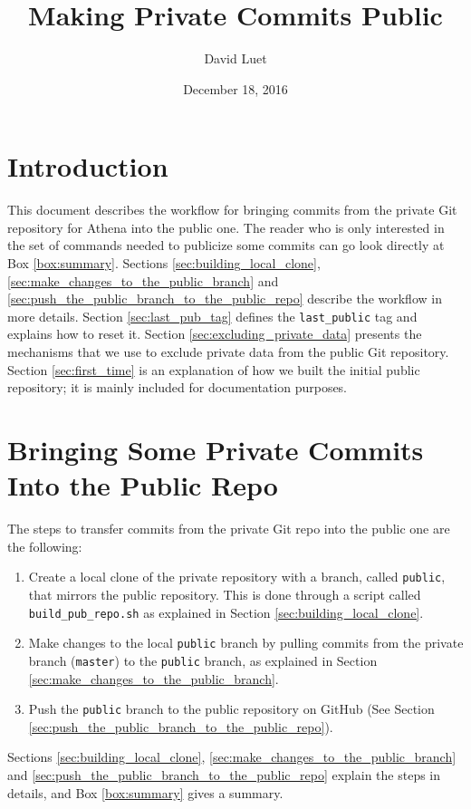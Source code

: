 \documentclass[11pt]{article}
\author{David Luet}
\date{December 18, 2016}
\title{Making Private Commits Public}
\begin{document}
\maketitle
\tableofcontents


\section{Introduction}
This document describes the workflow for bringing commits from the
private Git repository for Athena into the public one.  The reader who
is only interested in the set of commands needed to publicize some
commits can go look directly at Box \ref{box:summary}. Sections
\ref{sec:building_local_clone},
\ref{sec:make_changes_to_the_public_branch} and
\ref{sec:push_the_public_branch_to_the_public_repo} describe the
workflow in more details.  Section \ref{sec:last_pub_tag} defines the
\texttt{last\_public} tag and explains how to reset it.  Section
\ref{sec:excluding_private_data} presents the mechanisms that we use
to exclude private data from the public Git repository.  Section
\ref{sec:first_time} is an explanation of how we built the initial
public repository; it is mainly included for documentation purposes.

\section{Bringing Some Private Commits Into the Public Repo}
The steps to transfer commits from the private Git repo into the
public one are the following:
\begin{enumerate}
\item Create a local clone of the private repository with a branch,
called \texttt{public}, that mirrors the public repository. This is
done through a script called \texttt{build\_pub\_repo.sh} as explained
in Section \ref{sec:building_local_clone}.
\item Make changes to the local \texttt{public} branch by pulling
commits from the private branch (\texttt{master}) to the
\texttt{public} branch, as explained in Section
\ref{sec:make_changes_to_the_public_branch}.
\item Push the \texttt{public} branch to the public repository on
GitHub (See Section
\ref{sec:push_the_public_branch_to_the_public_repo}).
\end{enumerate}

Sections \ref{sec:building_local_clone},
\ref{sec:make_changes_to_the_public_branch} and
\ref{sec:push_the_public_branch_to_the_public_repo} explain the steps
in details, and Box \ref{box:summary} gives a summary.
\end{document}
